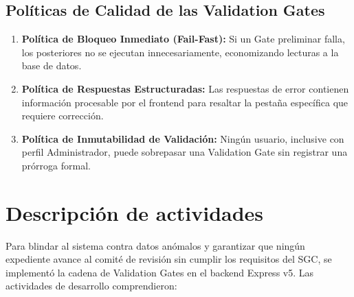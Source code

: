 \documentclass[12pt,a4paper]{article}
\begin{document}
\subsection{Políticas de Calidad de las Validation Gates}
\begin{enumerate}[leftmargin=1.5em, itemsep=2pt]
    \item \textbf{Política de Bloqueo Inmediato (Fail-Fast):} Si un Gate preliminar falla, los posteriores no se ejecutan innecesariamente, economizando lecturas a la base de datos.
    \item \textbf{Política de Respuestas Estructuradas:} Las respuestas de error contienen información procesable por el frontend para resaltar la pestaña específica que requiere corrección.
    \item \textbf{Política de Inmutabilidad de Validación:} Ningún usuario, inclusive con perfil Administrador, puede sobrepasar una Validation Gate sin registrar una prórroga formal.
\end{enumerate}

\section{Descripción de actividades}
Para blindar al sistema contra datos anómalos y garantizar que ningún expediente avance al comité de revisión sin cumplir los requisitos del SGC, se implementó la cadena de Validation Gates en el backend Express v5. Las actividades de desarrollo comprendieron:
\end{document}
